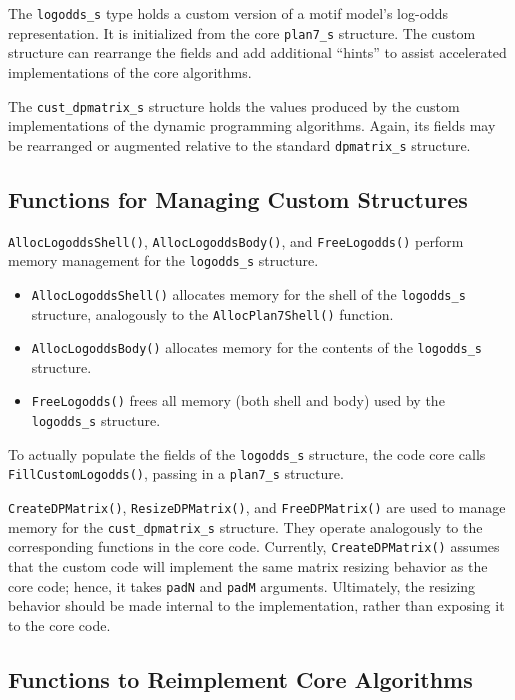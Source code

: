 \documentclass[letterpaper,10pt]{article}
\newcommand{\func}[1]{\texttt{#1()}}
\newcommand{\struct}[1]{\texttt{#1}}
\begin{document}
The \struct{logodds\_s} type holds a custom version of a motif
model's log-odds representation.  It is initialized from the core
\struct{plan7\_s} structure.  The custom structure can rearrange the
fields and add additional ``hints'' to assist accelerated
implementations of the core algorithms.

The \struct{cust\_dpmatrix\_s} structure holds the values produced by
the custom implementations of the dynamic programming
algorithms. Again, its fields may be rearranged or augmented
relative to the standard \struct{dpmatrix\_s} structure.


\subsection*{Functions for Managing Custom Structures}

\func{AllocLogoddsShell}, \func{AllocLogoddsBody}, and
\func{FreeLogodds} perform memory management for the 
\struct{logodds\_s} structure.
\begin{itemize}
\item \func{AllocLogoddsShell} allocates memory for the shell of the 
\struct{logodds\_s} structure, analogously to the \func{AllocPlan7Shell}
function.

\item \func{AllocLogoddsBody} allocates memory for the contents of
the \struct{logodds\_s} structure.

\item \func{FreeLogodds} frees all memory (both shell and body) used by
the \struct{logodds\_s} structure.
\end{itemize}
To actually populate the fields of the \struct{logodds\_s} structure,
the code core calls \func{FillCustomLogodds}, passing in a
\struct{plan7\_s} structure.

\func{CreateDPMatrix}, \func{ResizeDPMatrix}, and \func{FreeDPMatrix}
are used to manage memory for the \struct{cust\_dpmatrix\_s}
structure.  They operate analogously to the corresponding functions in
the core code.  Currently, \func{CreateDPMatrix} assumes that the
custom code will implement the same matrix resizing behavior as the
core code; hence, it takes \texttt{padN} and \texttt{padM} arguments.
Ultimately, the resizing behavior should be made internal to the
implementation, rather than exposing it to the core code.

\subsection*{Functions to Reimplement Core Algorithms}
\end{document}
